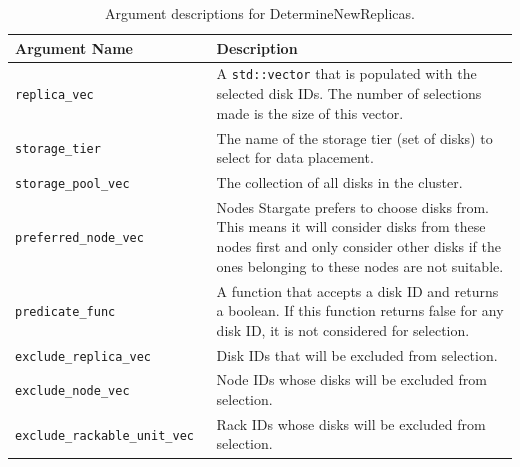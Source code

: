 \documentclass[12pt]{article}
\begin{document}
    \begin{table}[htbp]
      \caption{Argument descriptions for DetermineNewReplicas.}
      \label{tbl:determinenewreplicas}
      \begin{tabular}{ | p{0.4\linewidth} | p{0.6\linewidth} | }
        \hline
        \textbf{Argument Name} & \textbf{Description} \\ \hline
        \verb|replica_vec| & A \texttt{std::vector} that is populated with the selected
                             disk IDs. The number of selections made is the
                             size of this vector. \\ \hline

        \verb|storage_tier| & The name of the storage tier (set of disks) to
                              select for data placement. \\ \hline
 
        \verb|storage_pool_vec| & The collection of all disks in the cluster.  \\ \hline

        \verb|preferred_node_vec| & Nodes Stargate prefers to choose disks from. This
                                    means it will consider disks from these
                                    nodes first and only consider other disks
                                    if the ones belonging to these nodes are
                                    not suitable. \\ \hline

        \verb|predicate_func| & A function that accepts a disk ID and returns a
                                boolean. If this function returns false
                                for any disk ID, it is not considered for
                                selection. \\ \hline

        \verb|exclude_replica_vec| & Disk IDs that will be excluded from
                                     selection. \\ \hline

        \verb|exclude_node_vec| & Node IDs whose disks will be excluded from
                                  selection. \\ \hline

        \verb|exclude_rackable_unit_vec| & Rack IDs whose disks will be
                                           excluded from selection. \\ \hline

        \hline
      \end{tabular}
    \end{table}
\end{document}
